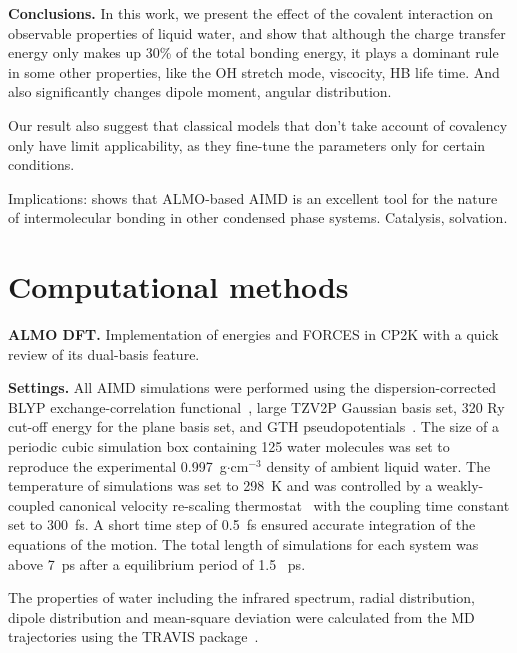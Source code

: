 \documentclass[aps,prl,reprint,amsmath,amssymb]{revtex4-1}
\begin{document}
\textbf{Conclusions.} In this work, we present the effect of the covalent interaction on observable properties of liquid water, and show that although the charge transfer energy only makes up 30\% of the total bonding energy, it plays a dominant rule in some other properties, like the OH stretch mode, viscocity, HB life time. 
And also significantly changes dipole moment, angular distribution.
 
Our result also suggest that classical models that don't take account of covalency only have limit applicability, as they fine-tune the parameters only for certain conditions.
 
Implications: shows that ALMO-based AIMD is an excellent tool for the nature of intermolecular bonding in other condensed phase systems. 
Catalysis, solvation.

\section{Computational methods}

\textbf{ALMO DFT.} Implementation of energies and FORCES in CP2K with a quick review of its dual-basis feature.

\textbf{Settings.} All AIMD simulations were performed using the dispersion-corrected~\cite{grimme2010consistent} BLYP exchange-correlation functional~\cite{becke1988density}, large TZV2P Gaussian basis set, 320 Ry cut-off energy for the plane basis set, and GTH pseudopotentials~\cite{goedecker1996separable,krack2005pseudopotentials}. 
The size of a periodic cubic simulation box containing 125 water molecules was set to reproduce the experimental 0.997~g$\cdot$cm$^{-3}$ density of ambient liquid water. 
The temperature of simulations was set to 298~K and was controlled by a weakly-coupled canonical velocity re-scaling thermostat~\cite{bussi2007canonical} with the coupling time constant set to 300~fs. 
A short time step of 0.5~fs ensured accurate integration of the equations of the motion. 
The total length of simulations for each system was above 7~ps after a equilibrium period of 1.5 ~ps.

The properties of water including the infrared spectrum, radial distribution, dipole distribution and mean-square deviation were calculated from the MD trajectories using the TRAVIS package~\cite{brehm2012travis}.  
\end{document}
